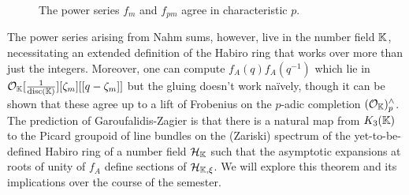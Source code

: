 \begin{figure}[h]
    
    \caption{The power series $f_{m}$ and $f_{pm}$ agree in characteristic $p$.}

\end{figure}

The power series arising from Nahm sums, however, live in the number field $\mathbb{K}$, necessitating an extended definition of the Habiro ring that works over more than just the integers. Moreover, one can compute $f_{A}(q)f_{A}(q^{-1})$ which lie in $\mathcal{O}_{\mathbb{K}}[\frac{1}{\mathrm{disc}(\mathbb{K})}][\zeta_{m}][[q-\zeta_{m}]]$ but the gluing doesn't work na\"{i}vely, though it can be shown that these agree up to a lift of Frobenius on the $p$-adic completion $(\mathcal{O}_{\mathbb{K}})^{\wedge}_{p}$. The prediction of Garoufalidis-Zagier is that there is a natural map from $K_{3}(\mathbb{K})$ to the Picard groupoid of line bundles on the (Zariski) spectrum of the yet-to-be-defined Habiro ring of a number field $\mathcal{H}_{\mathbb{K}}$ such that the asymptotic expansions at roots of unity of $f_{A}$ define sections of $\mathcal{H}_{\mathbb{K},\xi}$. We will explore this theorem and its implications over the course of the semester. 